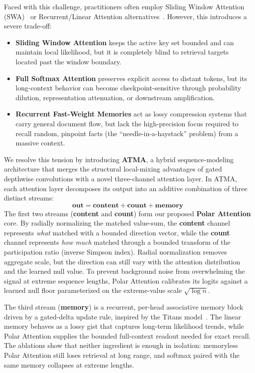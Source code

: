 \documentclass{article} %
\begin{document}
Faced with this challenge, practitioners often employ Sliding Window Attention (SWA)~\citep{beltagy2020longformer} or Recurrent/Linear Attention alternatives~\citep{deltanet2024, mamba2023}. However, this introduces a severe trade-off:
\begin{itemize}
    \item \textbf{Sliding Window Attention} keeps the active key set bounded and can maintain local likelihood, but it is completely blind to retrieval targets located past the window boundary.
    \item \textbf{Full Softmax Attention} preserves explicit access to distant tokens, but its long-context behavior can become checkpoint-sensitive through probability dilution, representation attenuation, or downstream amplification.
    \item \textbf{Recurrent Fast-Weight Memories} act as lossy compression systems that carry general document flow, but lack the high-precision focus required to recall random, pinpoint facts (the ``needle-in-a-haystack'' problem) from a massive context.
\end{itemize}

We resolve this tension by introducing \textbf{ATMA}, a hybrid sequence-modeling architecture that merges the structural local-mixing advantages of gated depthwise convolutions with a novel three-channel attention layer. In ATMA, each attention layer decomposes its output into an additive combination of three distinct streams:
\begin{equation}
    \mathbf{out} = \mathbf{content} + \mathbf{count} + \mathbf{memory}
\end{equation}
The first two streams (\textbf{content} and \textbf{count}) form our proposed \textbf{Polar Attention} core. By radially normalizing the matched value-sum, the \textbf{content} channel represents \textit{what} matched with a bounded direction vector, while the \textbf{count} channel represents \textit{how much} matched through a bounded transform of the participation ratio (inverse Simpson index). Radial normalization removes aggregate scale, but the direction can still vary with the attention distribution and the learned null value. To prevent background noise from overwhelming the signal at extreme sequence lengths, Polar Attention calibrates its logits against a learned null floor parameterized on the extreme-value scale $\sqrt{\log n}$.

The third stream (\textbf{memory}) is a recurrent, per-head associative memory block driven by a gated-delta update rule, inspired by the Titans model~\citep{titans2025}. The linear memory behaves as a lossy gist that captures long-term likelihood trends, while Polar Attention supplies the bounded full-context readout needed for exact recall. The ablations show that neither ingredient is enough in isolation: memoryless Polar Attention still loses retrieval at long range, and softmax paired with the same memory collapses at extreme lengths.
\end{document}
